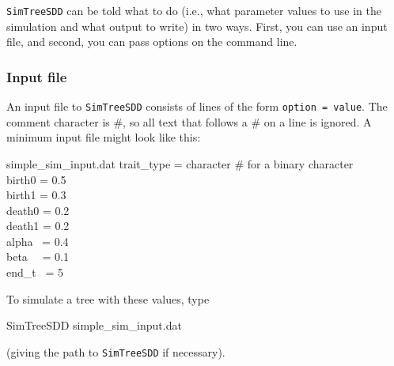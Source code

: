 \documentclass[10pt]{article}
\begin{document}
\texttt{SimTreeSDD} can be told what to do (i.e., what parameter values to use in the simulation and what output to write) in two ways.
First, you can use an input file, and second, you can pass options on the command line.

\subsubsection*{Input file}

An input file to \texttt{SimTreeSDD} consists of lines of the form \texttt{option = value}.  The comment character is \#, so all text that follows a \# on a line is ignored.  A minimum input file might look like this:
\begin{filesays}{simple\_sim\_input.dat}
	trait\_type = character \# for a binary character \\
	birth0  = 0.5  \\
	birth1  = 0.3  \\
	death0  = 0.2  \\
	death1  = 0.2  \\
	alpha \  = 0.4  \\
	beta \ \  = 0.1  \\
	end\_t \ = 5 
\end{filesays}

To simulate a tree with these values, type
\begin{commandis}
	SimTreeSDD simple\_sim\_input.dat
\end{commandis}
(giving the path to \texttt{SimTreeSDD} if necessary).
\end{document}
